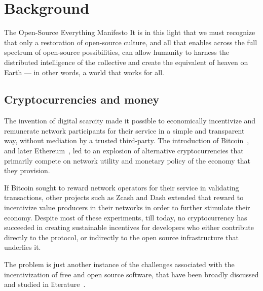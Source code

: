 \section{Background}

\begin{epigraph}{The Open-Source Everything Manifesto}
    \noindent It is in this light that we must recognize that only a restoration of
    open-source culture, and all that enables across the full spectrum of
    open-source possibilities, can allow humanity to harness the distributed
    intelligence of the collective and create the equivalent of heaven on Earth
    --- in other words, a world that works for all.
\end{epigraph}

\subsection{Cryptocurrencies and money}

The invention of digital scarcity made it possible to economically incentivize
and remunerate network participants for their service in a simple and
transparent way, without mediation by a trusted third-party. The introduction
of Bitcoin~\cite{bitcoin}, and later Ethereum~\cite{ethereum}, led to an
explosion of alternative cryptocurrencies that primarily compete on network
utility and monetary policy of the economy that they provision.


If Bitcoin sought to reward network operators for their service in validating
transactions, other projects such as Zcash and Dash extended that reward to
incentivize value producers in their networks in order to further stimulate
their economy. Despite most of these experiments, till today, no cryptocurrency
has succeeded in creating sustainable incentives for developers who either
contribute directly to the protocol, or indirectly to the open source
infrastructure that underlies it.

The problem is just another instance of the challenges associated with the
incentivization of free and open source software, that have been broadly
discussed and studied in literature~\cite{roads and bridges}.

